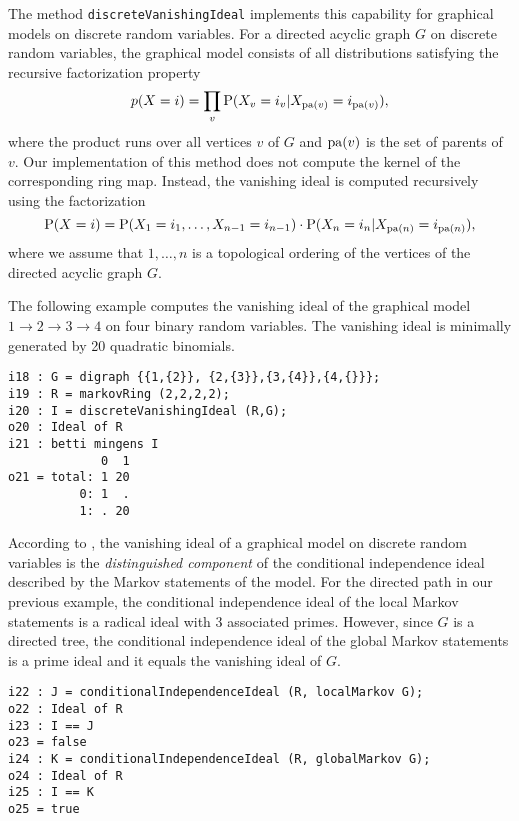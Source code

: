 \documentclass[letterpaper]{article}
\theoremstyle{plain}
\theoremstyle{definition}
\newcommand{\pa}{{\rm pa}}
\begin{document}
The method
{\tt discreteVanishingIdeal} implements this capability for graphical
models on discrete random variables. For a directed acyclic graph $G$ on discrete random variables, the graphical model consists
of all distributions satisfying the recursive factorization
property 
\[p(X = i) = \prod_{v} {\rm P}(X_{v} = i_{v} | X_{\pa(v)} = i_{\pa(v)}),\]
where the product runs over all vertices $v$ of $G$ and $\pa(v)$ is the set of
parents of $v$. 
Our implementation of this method does not compute the kernel of the
corresponding ring map. Instead, the vanishing ideal is
computed recursively using the factorization 
\[{\rm P}(X = i) = {\rm P}(X_{1} = i_{1},\dots, X_{n-1} = i_{n-1})\cdot {\rm P}(X_{n} = i_{n} | X_{\pa(n)} = i_{\pa(n)}),\]
where we assume that $1, \ldots, n$ is a topological ordering of
the vertices of the directed acyclic graph $G$.

The following example computes the vanishing ideal of the graphical model $1\to
2 \to 3\to 4$ on four binary random variables. The vanishing ideal is
minimally generated by 20 quadratic binomials.

\begin{verbatim}
i18 : G = digraph {{1,{2}}, {2,{3}},{3,{4}},{4,{}}};
i19 : R = markovRing (2,2,2,2);
i20 : I = discreteVanishingIdeal (R,G);
o20 : Ideal of R
i21 : betti mingens I
             0  1
o21 = total: 1 20
          0: 1  .
          1: . 20
\end{verbatim}

According to \cite{GSS}, the vanishing ideal of a graphical model on discrete
random variables is the \emph{distinguished
  component} of the conditional independence ideal described by the Markov
statements of the model. For the directed path in our previous example, the
conditional independence ideal of the local Markov statements 
is a radical ideal with 3 associated primes. However, since $G$ is a directed
tree, the conditional independence ideal of the global Markov statements is a
prime ideal and it equals the vanishing ideal of $G$.

 \begin{verbatim}
i22 : J = conditionalIndependenceIdeal (R, localMarkov G);
o22 : Ideal of R
i23 : I == J
o23 = false
i24 : K = conditionalIndependenceIdeal (R, globalMarkov G);
o24 : Ideal of R
i25 : I == K
o25 = true
\end{verbatim}
\end{document}
